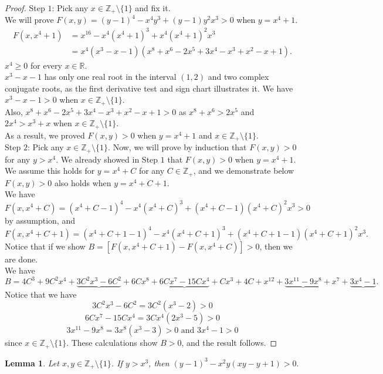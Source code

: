 \documentclass[11pt,reqno]{amsart}
\newtheorem{lem}[thm]{Lemma}
\begin{document}
\begin{proof}
Step $1$: Pick any $x \in \mathbb{Z}_{+} \setminus \{1\}$ and fix it.\\
We will prove $F(x,y)=(y-1)^4-x^4y^3+(y-1)y^2x^3>0$ when $y=x^4+1$. 
\begin{align*}
F(x,x^4+1) &=x^{16}-x^4(x^4+1)^3+x^4(x^4+1)^2x^3\\
&=x^4(x^3-x-1)(x^8+x^6-2x^5+3x^4-x^3+x^2-x+1).
\end{align*}
$x^4 \geqslant 0$ for every $x \in \mathbb{R}$.\\
$x^3-x-1$ has only one real root in the interval $(1,2)$ and two complex conjugate roots, as the first derivative test and sign chart illustrates it. We have $x^3-x-1>0$ when $x \in \mathbb{Z}_{+} \setminus \{1\}$.\\
Also, $x^8+x^6-2x^5+3x^4-x^3+x^2-x+1>0$ as $x^8+x^6> 2x^5$ and $2x^4>x^3+x$ when $x \in \mathbb{Z}_{+} \setminus \{1\}$.\\
As a result, we proved $F(x,y)>0$ when $y=x^4+1$ and $x \in \mathbb{Z}_{+} \setminus \{1\}$.\\
Step $2$: Pick any $x \in \mathbb{Z}_{+} \setminus \{1\}$. Now, we will prove by induction that $F(x,y)>0$ for any $y>x^4$. We already showed in Step $1$ that $F(x,y)>0$ when $y=x^4+1$. We assume this holds for $y=x^4+C$ for any $C \in \mathbb{Z}_{+}$, and we demonstrate below $F(x,y)>0$ also holds when $y=x^4+C+1.$\\
We have \[F(x,x^4+C)=(x^4+C-1)^4-x^{4}(x^4+C)^3+(x^4+C-1)(x^4+C)^{2}x^{3}>0\] by assumption, and 
\[F(x,x^4+C+1)=(x^4+C+1-1)^4-x^4(x^4+C+1)^3+(x^4+C+1-1)(x^4+C+1)^{2}x^3.\]
Notice that if we show $B=[F(x,x^4+C+1)-F(x,x^4+C)]>0$, then we are done.\\
We have
\[B= 4 C^{3} + 9 C^{2} x^{4} + \underbrace{3 C^2 x^3 - 6 C^2} + 6 C x^8 + \underbrace{6 C x^7 - 15 C x^4} + C x^3 + 4 C + x^{12} + \underbrace{3 x^{11} - 9 x^8} + x^7 + \underbrace{3 x^4 - 1}.\]
Notice that we have 
\[3 C^2 x^3 - 6 C^2=3C^2(x^3-2)>0\] 
\[6 C x^7 - 15 C x^4=3Cx^4(2x^3-5)>0\] 
\[3 x^{11} -9 x^8=3x^8(x^3-3)>0 \text{ \ \ \ and \ \ \ } 3 x^4 - 1>0\] since $x \in \mathbb{Z}_{+} \setminus \{1\}$. These calculations show $B>0$, and the result follows.
\end{proof}

\begin{lem} \label{induction2}
Let $x,y \in \mathbb{Z}_{+} \setminus \{1\}$. If $y>x^3$, then $(y-1)^3-x^{2}y(xy-y+1)>0.$
\end{lem}
\end{document}
